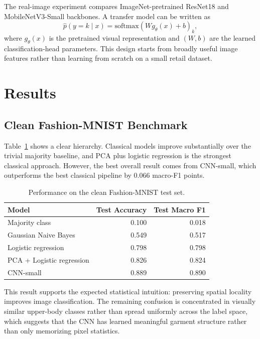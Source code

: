 \documentclass[11pt]{article}
\begin{document}
The real-image experiment compares ImageNet-pretrained ResNet18 and MobileNetV3-Small backbones. A transfer model can be written as
\begin{equation}
\hat{p}(y=k \mid x) = \mathrm{softmax}(W g_\theta(x) + b)_k,
\end{equation}
where $g_\theta(x)$ is the pretrained visual representation and $(W,b)$ are the learned classification-head parameters. This design starts from broadly useful image features rather than learning from scratch on a small retail dataset.

\section{Results}

\subsection{Clean Fashion-MNIST Benchmark}

Table~\ref{tab:fashion_results} shows a clear hierarchy. Classical models improve substantially over the trivial majority baseline, and PCA plus logistic regression is the strongest classical approach. However, the best overall result comes from CNN-small, which outperforms the best classical pipeline by 0.066 macro-F1 points.

\begin{table}[H]
\centering
\caption{Performance on the clean Fashion-MNIST test set.}
\label{tab:fashion_results}
\begin{tabular}{lrr}
\toprule
Model & Test Accuracy & Test Macro F1 \\
\midrule
Majority class & 0.100 & 0.018 \\
Gaussian Naive Bayes & 0.549 & 0.517 \\
Logistic regression & 0.798 & 0.798 \\
PCA + Logistic regression & 0.826 & 0.824 \\
CNN-small & 0.889 & 0.890 \\
\bottomrule
\end{tabular}
\end{table}

This result supports the expected statistical intuition: preserving spatial locality improves image classification. The remaining confusion is concentrated in visually similar upper-body classes rather than spread uniformly across the label space, which suggests that the CNN has learned meaningful garment structure rather than only memorizing pixel statistics.
\end{document}
